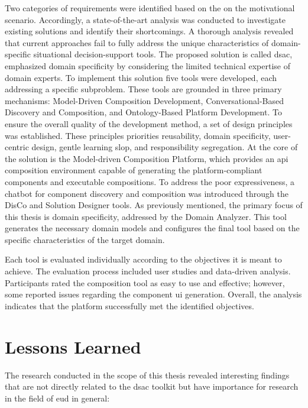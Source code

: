 Two categories of requirements were identified based on the on the motivational scenario. Accordingly, a state-of-the-art analysis was conducted to investigate existing solutions and identify their shortcomings. A thorough analysis revealed that current approaches fail to fully address the unique characteristics of domain-specific situational decision-support tools.
The proposed solution is called \gls{dsac}, emphasized domain specificity by considering the limited technical expertise of domain experts. To implement this solution five tools were developed, each addressing a specific subproblem. These tools are grounded in three primary mechanisms: Model-Driven Composition Development, Conversational-Based Discovery and Composition, and Ontology-Based Platform Development. To ensure the overall quality of the development method, a set of design principles was established. These principles priorities reusability,  domain specificity, user-centric design, gentle learning slop, and responsibility segregation. At the core of the solution is the Model-driven Composition Platform, which provides an \gls{api} composition environment capable of generating the platform-compliant components and executable compositions. To address the poor expressiveness, a chatbot for component discovery and composition was introduced through the DisCo and Solution Designer tools. As previously mentioned, the primary focus of this thesis is domain specificity, addressed by the Domain Analyzer. This tool generates the necessary domain models and configures the final tool based on the specific characteristics of the target domain. 

Each tool is evaluated individually according to the objectives it is meant to achieve. The evaluation process included user studies and data-driven analysis. Participants rated the composition tool as easy to use and effective; however, some reported issues regarding the component \gls{ui} generation.  Overall, the analysis indicates that the platform successfully met the identified objectives. 


\hypertarget{lessons-learned}{%
\section{Lessons Learned}\label{lessons-learned}}
\vspace{15pt}

The research conducted in the scope of this thesis revealed interesting findings that are not directly related to the \gls{dsac} toolkit but have importance for research in the field of \gls{eud} in general: 

